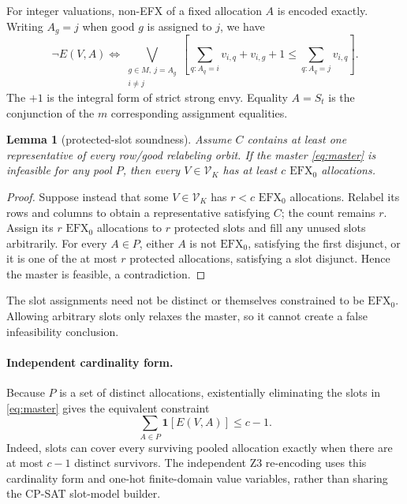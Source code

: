 \documentclass[11pt]{article}
\theoremstyle{plain}
\newtheorem{lemma}[theorem]{Lemma}
\theoremstyle{definition}
\newcommand{\efxo}{\mathrm{EFX}_0}
\begin{document}
For integer valuations, non-EFX of a fixed allocation $A$ is encoded exactly.
Writing $A_g=j$ when good $g$ is assigned to $j$, we have
\begin{equation}\label{eq:kill}
\neg E(V,A)
\iff
\bigvee_{\substack{g\in M,\ j=A_g\\i\ne j}}
\left[
 \sum_{q:A_q=i}v_{i,q}+v_{i,g}+1
 \le
 \sum_{q:A_q=j}v_{i,q}
\right].
\end{equation}
The $+1$ is the integral form of strict strong envy.  Equality $A=S_t$ is the
conjunction of the $m$ corresponding assignment equalities.

\begin{lemma}[protected-slot soundness]\label{lem:slots}
Assume $C$ contains at least one representative of every row/good relabeling
orbit.  If the master \eqref{eq:master} is infeasible for any pool $P$, then
every $V\in\mathcal V_K$ has at least $c$ $\efxo$ allocations.
\end{lemma}

\begin{proof}
Suppose instead that some $V\in\mathcal V_K$ has $r<c$ $\efxo$ allocations.
Relabel its rows and columns to obtain a representative satisfying $C$; the
count remains $r$.  Assign its $r$ $\efxo$ allocations to $r$ protected slots
and fill any unused slots arbitrarily.  For every $A\in P$, either $A$ is not
$\efxo$, satisfying the first disjunct, or it is one of the at most $r$
protected allocations, satisfying a slot disjunct.  Hence the master is
feasible, a contradiction.
\end{proof}

The slot assignments need not be distinct or themselves constrained to be
$\efxo$.  Allowing arbitrary slots only relaxes the master, so it cannot create
a false infeasibility conclusion.

\paragraph{Independent cardinality form.}
Because $P$ is a set of distinct allocations, existentially eliminating the
slots in \eqref{eq:master} gives the equivalent constraint
\[
  \sum_{A\in P}\mathbf 1[E(V,A)]\le c-1.
\]
Indeed, slots can cover every surviving pooled allocation exactly when there
are at most $c-1$ distinct survivors.  The independent Z3 re-encoding uses
this cardinality form and one-hot finite-domain value variables, rather than
sharing the CP-SAT slot-model builder.
\end{document}
